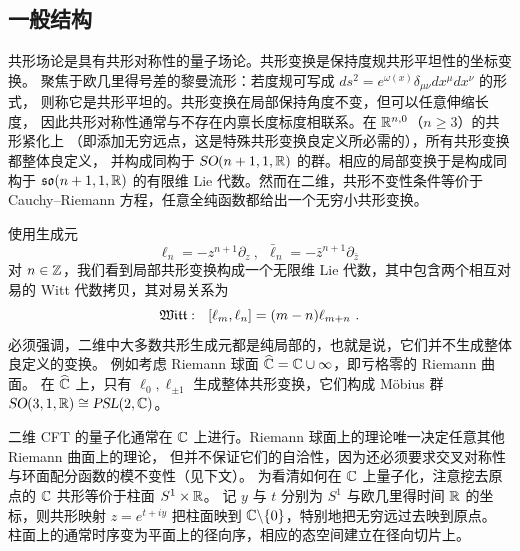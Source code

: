 \subsection{一般结构}
\label{subsec:CFTGeneral structure}

共形场论是具有共形对称性的量子场论。共形变换是保持度规共形平坦性的坐标变换。
聚焦于欧几里得号差的黎曼流形：若度规可写成 $ds^2=e^{\omega(x)}\delta_{\mu\nu}dx^\mu dx^\nu$ 的形式，
则称它是共形平坦的。共形变换在局部保持角度不变，但可以任意伸缩长度，
因此共形对称性通常与不存在内禀长度标度相联系。在 $\mathbb{R}^{n,0}$（$n\geq3$）的共形紧化上
（即添加无穷远点，这是特殊共形变换良定义所必需的），所有共形变换都整体良定义，
并构成同构于 $\operatorname{\textsl{SO}}(n+1,1,\mathbb{R})$ 的群。相应的局部变换于是构成同构于
$\mathfrak{so}(n+1,1,\mathbb{R})$ 的有限维 Lie 代数。然而在二维，共形不变性条件等价于
Cauchy–Riemann 方程，任意全纯函数都给出一个无穷小共形变换。


使用生成元
\begin{equation}
\label{eq:conf_gen}
\ell_n=-z^{n+1}\partial_z~,~~\bar{\ell}_n=-\bar{z}^{n+1}\partial_{\bar{z}}~
\end{equation}
对 $n\in\mathbb{Z}$，我们看到局部共形变换构成一个无限维 Lie 代数，其中包含两个相互对易的
Witt 代数拷贝，其对易关系为
\begin{equation}
\label{eq:witt}
\mathfrak{Witt}:~~[\ell_m,\ell_n]=(m-n)\ell_{m+n}~.
\end{equation}
必须强调，二维中大多数共形生成元都是纯局部的，也就是说，它们并不生成整体良定义的变换。
例如考虑 Riemann 球面 $\widehat{\mathbb{C}}=\mathbb{C}\cup\infty$，即亏格零的 Riemann 曲面。
在 $\widehat{\mathbb{C}}$ 上，只有 $\ell_{0},\ell_{\pm1}$ 生成整体共形变换，它们构成 M\"obius 群
$\operatorname{\textsl{SO}}(3,1,\mathbb{R})\cong\operatorname{\textsl{PSL}}(2,\mathbb{C})$。


二维 CFT 的量子化通常在 $\mathbb{C}$ 上进行。Riemann 球面上的理论唯一决定任意其他 Riemann 曲面上的理论，
但并不保证它们的自洽性，因为还必须要求交叉对称性与环面配分函数的模不变性（见下文）。
为看清如何在 $\mathbb{C}$ 上量子化，注意挖去原点的 $\mathbb{C}$ 共形等价于柱面 $S^1\times\mathbb{R}$。
记 $y$ 与 $t$ 分别为 $S^1$ 与欧几里得时间 $\mathbb{R}$ 的坐标，则共形映射 $z= e^{t+iy}$
把柱面映到 $\mathbb{C}\backslash\{0\}$，特别地把无穷远过去映到原点。
柱面上的通常时序变为平面上的径向序，相应的态空间建立在径向切片上。


